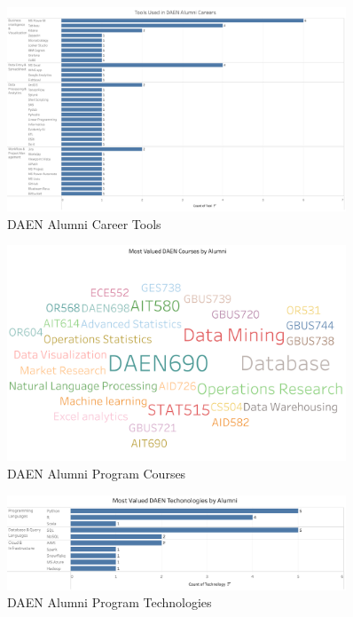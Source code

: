 \documentclass[12pt,a4paper]{article}
\begin{document}
\begin{figure}[H]
    \centering
    \includegraphics[width=0.9\textwidth]{visualizations/career-tools.png}
    \caption{DAEN Alumni Career Tools}
    \label{fig:career-tools}
\end{figure}

\begin{figure}[H]
    \centering
    \includegraphics[width=0.9\textwidth]{visualizations/daen-courses.png}
    \caption{DAEN Alumni Program Courses}
    \label{fig:daen-courses}
\end{figure}

\begin{figure}[H]
    \centering
    \includegraphics[width=0.9\textwidth]{visualizations/daen-technologies.png}
    \caption{DAEN Alumni Program Technologies}
    \label{fig:daen-technologies}
\end{figure}
\end{document}
